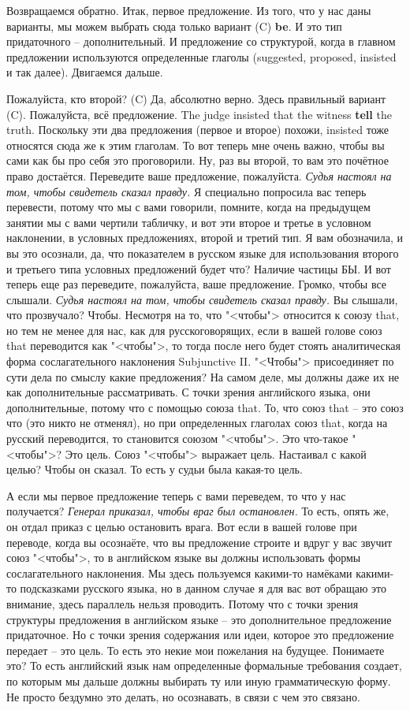 \documentclass[main.tex]{subfiles}
\begin{document}
Возвращаемся обратно.
Итак, первое предложение.
Из того, что у нас даны варианты, мы можем выбрать сюда только вариант (C) \textbf{be}.
И это тип придаточного -- дополнительный.
И предложение со структурой, когда в главном предложении используются определенные глаголы (suggested, proposed, insisted и так далее).
Двигаемся дальше.

Пожалуйста, кто второй?
(C)
Да, абсолютно верно.
Здесь правильный вариант (C).
Пожалуйста, всё предложение.
The judge insisted that the witness \textbf{tell} the truth.
Поскольку эти два предложения (первое и второе) похожи, insisted тоже относятся сюда же к этим глаголам.
То вот теперь мне очень важно, чтобы вы сами как бы про себя это проговорили.
Ну, раз вы второй, то вам это почётное право достаётся.
Переведите ваше предложение, пожалуйста.
\textit{Судья настоял на том, чтобы свидетель сказал правду.}
Я специально попросила вас теперь перевести, потому что мы с вами говорили, помните, когда на предыдущем занятии мы с вами чертили табличку, и вот эти второе и третье в условном наклонении, в условных предложениях, второй и третий тип.
Я вам обозначила, и вы это осознали, да, что показателем в русском языке для использования второго и третьего типа условных предложений будет что?
Наличие частицы БЫ.
И вот теперь еще раз переведите, пожалуйста, ваше предложение.
Громко, чтобы все слышали.
\textit{Судья настоял на том, чтобы свидетель сказал правду.}
Вы слышали, что прозвучало?
Чтобы.
Несмотря на то, что "<чтобы"> относится к союзу that, но тем не менее для нас, как для русскоговорящих, если в вашей голове союз that переводится как "<чтобы">, то тогда после него будет стоять аналитическая форма сослагательного наклонения Subjunctive II.
"<Чтобы"> присоединяет по сути дела по смыслу какие предложения?
На самом деле, мы должны даже их не как дополнительные рассматривать.
С точки зрения английского языка, они дополнительные, потому что с помощью союза that.
То, что союз that -- это союз что (это никто не отменял), но при определенных глаголах союз that, когда на русский переводится, то становится союзом "<чтобы">.
Это что-такое "<чтобы">?
Это цель.
Союз "<чтобы"> выражает цель.
Настаивал с какой целью?
Чтобы он сказал.
То есть у судьи была какая-то цель.

А если мы первое предложение теперь с вами переведем, то что у нас получается?
\textit{Генерал приказал, чтобы враг был остановлен.}
То есть, опять же, он отдал приказ с целью остановить врага.
Вот если в вашей голове при переводе, когда вы осознаёте, что вы предложение строите и вдруг у вас звучит союз "<чтобы">, то в английском языке вы должны использовать формы сослагательного наклонения.
Мы здесь пользуемся какими-то намёками какими-то подсказками русского языка, но в данном случае я для вас вот обращаю это внимание, здесь параллель нельзя проводить.
Потому что с точки зрения структуры предложения в английском языке -- это дополнительное предложение придаточное.
Но с точки зрения содержания или идеи, которое это предложение передает -- это цель.
То есть это некие мои пожелания на будущее.
Понимаете это?
То есть английский язык нам определенные формальные требования создает, по которым мы дальше должны выбирать ту или иную грамматическую форму.
Не просто бездумно это делать, но осознавать, в связи с чем это связано.
\end{document}
